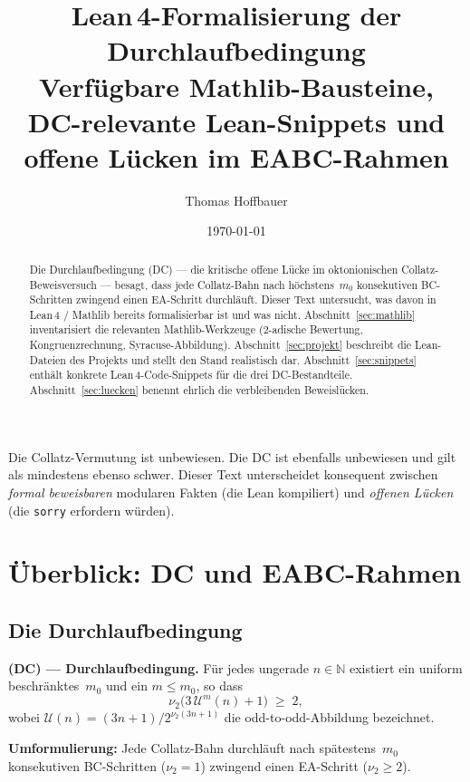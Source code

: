 \documentclass[12pt,a4paper]{article}
\title{%
  Lean\,4-Formalisierung der Durchlaufbedingung\\[0.3em]
  \large Verfügbare Mathlib-Bausteine, DC-relevante Lean-Snippets
  und offene Lücken im EABC-Rahmen%
}
\author{Thomas Hoffbauer}
\date{\today}
\newcommand{\vii}{\nu_2}
\newcommand{\U}{\mathcal{U}}
\newcommand{\N}{\mathbb{N}}
\begin{document}
\maketitle

\begin{abstract}
Die Durchlaufbedingung (DC) --- die kritische offene Lücke im oktonionischen
Collatz-Beweisversuch --- besagt, dass jede Collatz-Bahn nach höchstens~$m_0$
konsekutiven BC-Schritten zwingend einen EA-Schritt durchläuft.
Dieser Text untersucht, was davon in Lean\,4 / Mathlib bereits formalisierbar ist
und was nicht.
Abschnitt~\ref{sec:mathlib} inventarisiert die relevanten Mathlib-Werkzeuge
(2-adische Bewertung, Kongruenzrechnung, Syracuse-Abbildung).
Abschnitt~\ref{sec:projekt} beschreibt die Lean-Dateien des Projekts
und stellt den Stand realistisch dar.
Abschnitt~\ref{sec:snippets} enthält konkrete Lean\,4-Code-Snippets
für die drei DC-Bestandteile.
Abschnitt~\ref{sec:luecken} benennt ehrlich die verbleibenden Beweislücken.
\end{abstract}

\tableofcontents

\bigskip
\begin{tcolorbox}[warnung, title={Zur Einordnung}]
Die Collatz-Vermutung ist unbewiesen. Die DC ist ebenfalls unbewiesen und gilt
als mindestens ebenso schwer. Dieser Text unterscheidet konsequent zwischen
\emph{formal beweisbaren} modularen Fakten (die Lean kompiliert)
und \emph{offenen Lücken} (die \texttt{sorry} erfordern würden).
\end{tcolorbox}

\section{Überblick: DC und EABC-Rahmen}
\label{sec:ueber}

\subsection{Die Durchlaufbedingung}

\begin{tcolorbox}[kernidee]
\textbf{(DC) --- Durchlaufbedingung.}\quad
Für jedes ungerade $n \in \N$ existiert ein uniform beschränktes~$m_0$ und ein
$m \leq m_0$, so dass
\[
  \vii\!\bigl(3\,\U^m(n) + 1\bigr) \;\geq\; 2,
\]
wobei $\U(n) = (3n+1)/2^{\vii(3n+1)}$ die odd-to-odd-Abbildung bezeichnet.

\medskip
\textbf{Umformulierung:} Jede Collatz-Bahn durchläuft nach spätestens~$m_0$
konsekutiven BC-Schritten ($\vii = 1$) zwingend einen EA-Schritt ($\vii \geq 2$).
\end{tcolorbox}
\end{document}
